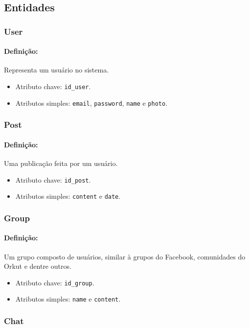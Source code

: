 \documentclass{article}
\begin{document}
\subsection{Entidades}
\subsubsection{User}
\paragraph{Definição:} Representa um usuário no sistema.
\begin{itemize}
        \item Atributo chave: \verb|id_user|.
        \item Atributos simples: \verb|email|, \verb|password|, \verb|name| e \verb|photo|.
\end{itemize}

\subsubsection{Post}
\paragraph{Definição:} Uma publicação feita por um usuário.
\begin{itemize}
        \item Atributo chave: \verb|id_post|.
        \item Atributos simples: \verb|content| e \verb|date|.
\end{itemize}

\subsubsection{Group}
\paragraph{Definição:} Um grupo composto de usuários, similar à grupos do Facebook, comunidades do Orkut e dentre outros.
\begin{itemize}
        \item Atributo chave: \verb|id_group|.
        \item Atributos simples: \verb|name| e \verb|content|.
\end{itemize}

\subsubsection{Chat}
\end{document}
